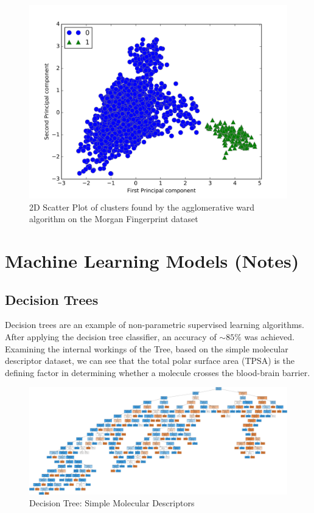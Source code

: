 \documentclass[a4paper,12pt]{report}
\begin{document}
			\begin{figure}[H]
				\centering
				\includegraphics[width=\textwidth,scale=1,totalheight=0.4\textheight]{images/agg_morgan_scatter}
				\caption{2D Scatter Plot of clusters found by the agglomerative ward algorithm on the Morgan Fingerprint dataset}
				\label{fig:agg_morgan_scatter}
			\end{figure}
			

	\section{Machine Learning Models (Notes)}
		\subsection{Decision Trees}
				Decision trees are an example of non-parametric supervised learning algorithms.
				After applying the decision tree classifier, an accuracy of $\sim85\%$ was achieved. Examining the internal workings of the Tree, based on the simple molecular descriptor dataset, we can see that the total polar surface area (TPSA) is the defining factor in determining whether a molecule crosses the blood-brain barrier.
				\begin{figure}[H]
					\centering
					\includegraphics[width=\textwidth,scale=1,totalheight=0.4\textheight]{images/bbb_tree_smd}
					\caption{Decision Tree: Simple Molecular Descriptors}
					\label{fig:bbb_tree_smd}
				\end{figure}		
\end{document}
